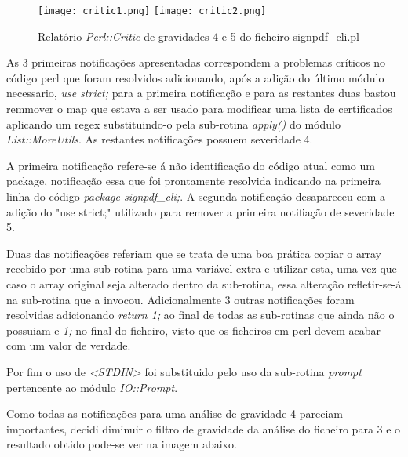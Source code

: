 \begin{figure}[H]

  \centering
  \captionsetup{justification=centering}

  \texttt{[image: critic1.png]}
  \texttt{[image: critic2.png]}
  
  \caption {Relatório \textit{Perl::Critic} de gravidades 4 e 5 do ficheiro signpdf\_cli.pl}

\end{figure}

\par As 3 primeiras notificações apresentadas correspondem a problemas críticos no código perl que foram resolvidos adicionando, após a adição do último módulo necessario, \textit{use strict;} para a primeira notificação e para as restantes duas bastou remmover o map que estava a ser usado para modificar uma lista de certificados aplicando um regex substituindo-o pela sub-rotina \textit{apply()} do módulo \textit{List::MoreUtils}\cite{perllist}. As restantes notificações possuem severidade 4. 
\par A primeira notificação refere-se á não identificação do código atual como um package, notificação essa que foi prontamente resolvida indicando na primeira linha do código \textit{package signpdf\_cli;}. A segunda notificação desapareceu com a adição do "use strict;" utilizado para remover a primeira notifiação de severidade 5.
\par Duas das notificações referiam que se trata de uma boa prática copiar o array recebido por uma sub-rotina para uma variável extra e utilizar esta, uma vez que caso o array original seja alterado dentro da sub-rotina, essa alteração \mbox{refletir-se-á} na sub-rotina que a invocou. Adicionalmente 3 outras notificações foram resolvidas adicionando \textit{return 1;} ao final de todas as sub-rotinas que ainda não o possuiam e \textit{1;} no final do ficheiro, visto que os ficheiros em perl devem acabar com um valor de verdade.
\par Por fim o uso de \textit{<STDIN>} foi substituido pelo uso da sub-rotina \textit{prompt} pertencente ao módulo \textit{IO::Prompt}\cite{ioPrompt}.

Como todas as notificações para uma análise de gravidade 4 pareciam importantes, decidi diminuir o filtro de gravidade da análise do ficheiro para 3 e o resultado obtido pode-se ver na imagem abaixo.

